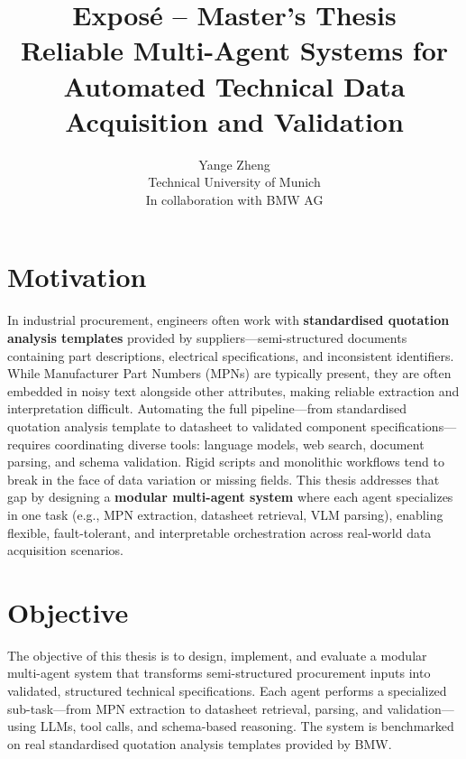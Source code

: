 \documentclass[11pt]{article}
\title{\textbf{Exposé – Master's Thesis}\\Reliable Multi-Agent Systems for Automated Technical Data Acquisition and Validation}
\author{Yange Zheng\\Technical University of Munich\\In collaboration with BMW AG}
\date{}
\begin{document}
\maketitle

\section*{Motivation}
In industrial procurement, engineers often work with \textbf{standardised quotation analysis templates} provided by suppliers—semi-structured documents containing part descriptions, electrical specifications, and inconsistent identifiers. While Manufacturer Part Numbers (MPNs) are typically present, they are often embedded in noisy text alongside other attributes, making reliable extraction and interpretation difficult. Automating the full pipeline—from standardised quotation analysis template to datasheet to validated component specifications—requires coordinating diverse tools: language models, web search, document parsing, and schema validation. Rigid scripts and monolithic workflows tend to break in the face of data variation or missing fields. This thesis addresses that gap by designing a \textbf{modular multi-agent system} where each agent specializes in one task (e.g., MPN extraction, datasheet retrieval, VLM parsing), enabling flexible, fault-tolerant, and interpretable orchestration across real-world data acquisition scenarios.

\section*{Objective}
The objective of this thesis is to design, implement, and evaluate a modular multi-agent system that transforms semi-structured procurement inputs into validated, structured technical specifications. Each agent performs a specialized sub-task—from MPN extraction to datasheet retrieval, parsing, and validation—using LLMs, tool calls, and schema-based reasoning. The system is benchmarked on real standardised quotation analysis templates provided by BMW.
\end{document}
